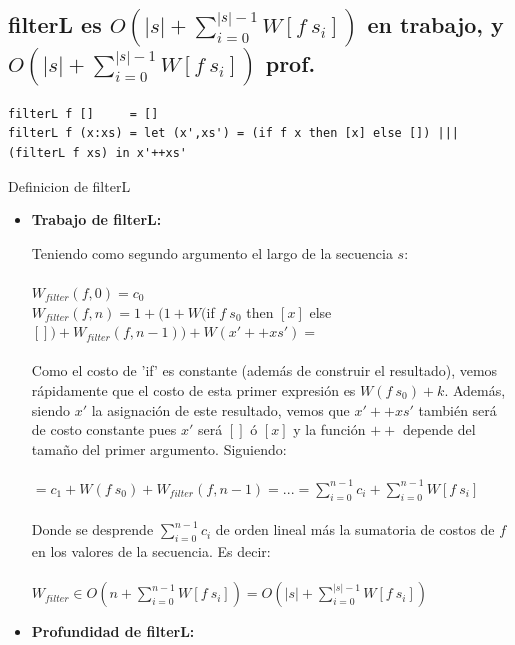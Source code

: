 \documentclass[12pt]{article}
\begin{document}
\subsection{filterL es $O(|s| + \sum\limits_{i=0}^{|s|-1} W[f\ s_i])$ en trabajo, y $O(|s| + \sum\limits_{i=0}^{|s|-1} W[f\ s_i])$ prof.}

\begin{table}[h]
\begin{lstlisting}
filterL f []     = []
filterL f (x:xs) = let (x',xs') = (if f x then [x] else []) ||| (filterL f xs) in x'++xs'
\end{lstlisting}
\caption{Definicion de filterL}
\end{table}
\begin{itemize}

\item \textbf{Trabajo de filterL:}

Teniendo como segundo argumento el largo de la secuencia $s$: \\
\\
    $W_{filter}(f, 0) = c_0$ \\
    $W_{filter}(f, n) = 1 + ( 1 + W($if $f\ s_0$ then $[x]$ else $[]) + W_{filter}(f, n-1) ) + W(x'++xs') = $ \\
\\
    Como el costo de 'if' es constante (además de construir el resultado), vemos rápidamente que el costo de esta primer expresión es $W(f\ s_0) + k$.
    Además, siendo $x'$ la asignación de este resultado, vemos que $x'++xs'$ también será de costo constante pues $x'$ será $[]$ ó $[x]$ y la función $++$ depende del tamaño del primer argumento. Siguiendo:\\
\\
    $ = c_1 + W(f\ s_0) + W_{filter}(f, n-1) = ... = \sum\limits_{i=0}^{n-1} c_i + \sum\limits_{i=0}^{n-1} W[f\ s_i] $ \\
\\
    Donde se desprende $\sum\limits_{i=0}^{n-1} c_i$ de orden lineal más la sumatoria de costos de $f$ en los valores de la secuencia. Es decir: \\
\\
    $W_{filter} \in O(n + \sum\limits_{i=0}^{n-1} W[f\ s_i] ) = O(|s| + \sum\limits_{i=0}^{|s|-1} W[f\ s_i])$\\

\item \textbf{Profundidad de filterL:}


\end{itemize}
\end{document}
